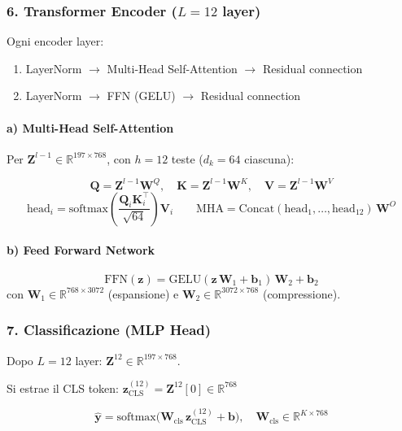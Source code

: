 \documentclass[
  11pt,
]{article}
\begin{document}
\subsubsection{6. Transformer Encoder ($L = 12$ layer)}

Ogni encoder layer:
\begin{enumerate}
\item LayerNorm $\to$ Multi-Head Self-Attention $\to$ Residual connection
\item LayerNorm $\to$ FFN (GELU) $\to$ Residual connection
\end{enumerate}

\paragraph{a) Multi-Head Self-Attention}

Per $\mathbf{Z}^{l-1} \in \mathbb{R}^{197 \times 768}$, con $h = 12$ teste ($d_k = 64$ ciascuna):

\[
\mathbf{Q} = \mathbf{Z}^{l-1}\mathbf{W}^Q, \quad
\mathbf{K} = \mathbf{Z}^{l-1}\mathbf{W}^K, \quad
\mathbf{V} = \mathbf{Z}^{l-1}\mathbf{W}^V
\]
\[
\text{head}_i = \text{softmax}\!\left(\frac{\mathbf{Q}_i\mathbf{K}_i^\top}{\sqrt{64}}\right)\mathbf{V}_i
\qquad
\text{MHA} = \text{Concat}(\text{head}_1, \ldots, \text{head}_{12})\,\mathbf{W}^O
\]

\paragraph{b) Feed Forward Network}

\[
\text{FFN}(\mathbf{z}) = \text{GELU}(\mathbf{z}\,\mathbf{W}_1 + \mathbf{b}_1)\,\mathbf{W}_2 + \mathbf{b}_2
\]
con $\mathbf{W}_1 \in \mathbb{R}^{768 \times 3072}$ (espansione) e $\mathbf{W}_2 \in \mathbb{R}^{3072 \times 768}$ (compressione).

\subsubsection{7. Classificazione (MLP Head)}

Dopo $L = 12$ layer: $\mathbf{Z}^{12} \in \mathbb{R}^{197 \times 768}$.

Si estrae il CLS token: $\mathbf{z}_{\text{CLS}}^{(12)} = \mathbf{Z}^{12}[0] \in \mathbb{R}^{768}$

\begin{formulabox}[title={\textbf{Classificazione finale}}]
\[
\hat{\mathbf{y}} = \text{softmax}\!\bigl(\mathbf{W}_{\text{cls}}\,\mathbf{z}_{\text{CLS}}^{(12)} + \mathbf{b}\bigr),
\quad \mathbf{W}_{\text{cls}} \in \mathbb{R}^{K \times 768}
\]
\end{formulabox}
\end{document}
